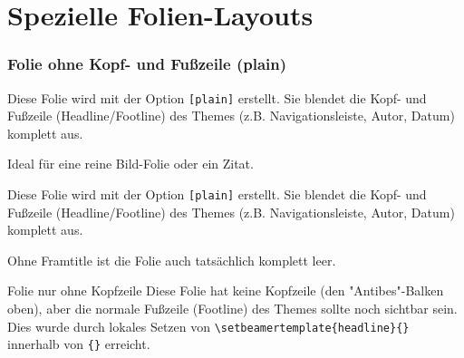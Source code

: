 \section{Spezielle Folien-Layouts}

\begin{frame}[plain]
    \frametitle{Folie ohne Kopf- und Fußzeile (plain)}
    
    Diese Folie wird mit der Option \texttt{[plain]} erstellt.
    Sie blendet die Kopf- und Fußzeile (Headline/Footline) des Themes 
    (z.B. Navigationsleiste, Autor, Datum) komplett aus.
    
    \vfill
    \begin{center}
    \Huge Ideal für eine reine Bild-Folie oder ein Zitat.
    \end{center}
    \vfill
    
\end{frame}

\begin{frame}[plain]
    Diese Folie wird mit der Option \texttt{[plain]} erstellt.
    Sie blendet die Kopf- und Fußzeile (Headline/Footline) des Themes 
    (z.B. Navigationsleiste, Autor, Datum) komplett aus.
    
    \vfill
    \begin{center}
    \Huge Ohne Framtitle ist die Folie auch tatsächlich komplett leer.
    \end{center}
    \vfill
    
\end{frame}

{ %
    \begin{frame}{Folie nur ohne Kopfzeile}
        Diese Folie hat keine Kopfzeile (den "Antibes"-Balken oben), 
        aber die normale Fußzeile (Footline) des Themes sollte noch sichtbar sein.
        \vfill
        Dies wurde durch lokales Setzen von 
        \texttt{\textbackslash setbeamertemplate\{headline\}\{\}}
        innerhalb von \texttt{\{\}} erreicht.
    \end{frame}
} %
